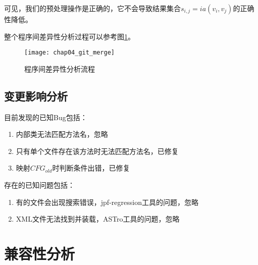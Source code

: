 可见，我们的预处理操作是正确的，它不会导致结果集合$s_{i,j} = ia(v_i,v_j)$的正确性降低。

整个程序间差异性分析过程可以参考图\ref {diff}。

\begin{figure}[H]
	\centering
	\texttt{[image: chap04\_git\_merge]}
	\caption {程序间差异性分析流程}
	\label {diff}	
\end{figure}

\subsection{变更影响分析}

目前发现的已知Bug包括：
\begin{enumerate}
	\item 内部类无法匹配方法名，忽略
	\item 只有单个文件存在该方法时无法匹配方法名，已修复
	\item 映射$CFG_{old}$时判断条件出错，已修复
\end{enumerate}

存在的已知问题包括：
\begin{enumerate}
	\item 有的文件会出现搜索错误，jpf-regression工具的问题，忽略
	\item XML文件无法找到并装载，ASTro工具的问题，忽略
\end{enumerate}
\section{兼容性分析}